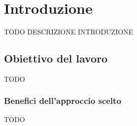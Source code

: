 \chapter{Introduzione}
\lhead[\fancyplain{}{\bfseries\thepage}]{\fancyplain{}{\bfseries\rightmark}}
TODO DESCRIZIONE INTRODUZIONE

\section{Obiettivo del lavoro}
TODO 


\subsection{Benefici dell'approccio scelto}
TODO 